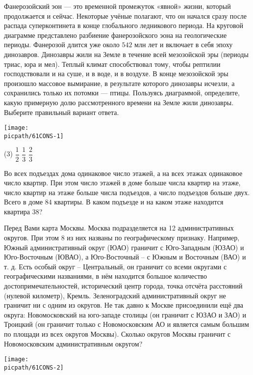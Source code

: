 \begin{consultation}
\begin{listofex}
			\item Фанерозойский эон --- это временной промежуток «явной» жизни, который продолжается и сейчас. Некоторые учёные полагают, что он начался сразу после распада суперконтинета в конце глобального ледникового периода. На круговой диаграмме представлено разбиение фанерозойского эона на геологические периоды. Фанерозой длится уже около \(542\) млн лет и включает в себя эпоху динозавров. Динозавры жили на Земле в течение всей мезозойской эры (периоды триас, юра и мел). Теплый климат способствовал тому, чтобы рептилии господствовали и на суше, и в воде, и в воздухе. В конце мезозойской эры произошло массовое вымирание, в результате которого динозавры исчезли, а сохранились только их потомки --- птицы. Пользуясь диаграммой, определите, какую примерную долю рассмотренного времени на Земле жили динозавры. Выберите правильный вариант ответа.
		
		\hspace{0.1\linewidth}
		\begin{minipage}[c]{250pt}
			\texttt{[image: \\picpath/61CONS-1]}
		\end{minipage}
		\begin{tasks}(3)
			\task \( \dfrac{1}{2} \)
			\task \( \dfrac{1}{3} \)
			\task \( \dfrac{2}{3} \)
		\end{tasks}
		\item Во всех подъездах дома одинаковое число этажей, а на всех этажах одинаковое число квартир. При этом число этажей в доме больше числа квартир на этаже, число квартир на этаже больше числа подъездов, а число подъездов больше двух. Всего в доме \(84\) квартиры. В каком подъезде и на каком этаже находится квартира \(38\)?
		\item 
		\begin{minipage}[t]{200pt}
		Перед Вами карта Москвы. Москва подразделяется на 12 административных округов. При этом 8 из них названы по географическому признаку. Например, Южный административный округ (ЮАО) граничит с Юго-Западным (ЮЗАО) и Юго-Восточным (ЮВАО), а Юго-Восточный – с Южным и Восточным (ВАО) и т. д. Есть особый округ – Центральный, он граничит со всеми округами с географическими названиями, в нём находится большое количество достопримечательностей, исторический центр города, точка отсчёта расстояний (нулевой километр), Кремль. Зеленоградский административный округ не граничит ни с одним из округов. Не так давно к Москве присоединили ещё два округа: Новомосковский на юго-западе столицы (он граничит с ЮЗАО и ЗАО) и Троицкий (он граничит только с Новомосковским АО и является самым большим по площади из всех округов Москвы). Сколько округов Москвы граничит с Новомосковским административным округом?
		\end{minipage}
	\hspace{0.01\linewidth}
		\begin{minipage}[t]{110pt}
		\texttt{[image: \\picpath/61CONS-2]}
		\end{minipage}
	\end{listofex}
\end{consultation}
